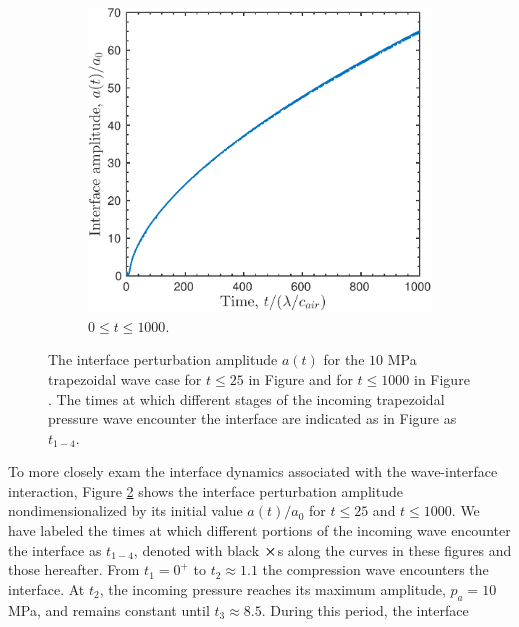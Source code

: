 \begin{figure}[h]
\begin{subfigure}[b]{0.45\textwidth}
    \includegraphics[width=\textwidth]{./figs/lung_figs/interface_single-case_linear}%
    \caption{\label{fig:trapz10_interface1000} $0\leq t \leq 1000$.}
  \end{subfigure}
  \caption[The interface perturbation amplitude history for 10 MPa
  trapezoidal wave]{The interface perturbation amplitude $a(t)$ for
    the $10$ MPa trapezoidal wave case for $t\leq25$ in Figure \protect{} and for
    $t\leq1000$ in Figure \protect{}. The times at which different stages of the
    incoming trapezoidal pressure wave encounter the interface are
    indicated as in Figure \protect{} as $t_{1-4}$.}
  \label{fig:trapz10_interface}
\end{figure}\par
% 
To more closely exam the interface dynamics associated with the
wave-interface interaction, Figure \ref{fig:trapz10_interface} shows
the interface perturbation amplitude nondimensionalized by its initial
value $a(t)/a_0$ for $t\leq25$ and $t\leq1000$. We have labeled the times at which
different portions of the incoming wave encounter the interface as
$t_{1-4}$, denoted with black $\boldsymbol{\times}$s along the curves in these
figures and those hereafter. From $t_1=0^+$ to $t_2\approx1.1$ the
compression wave encounters the interface. At $t_2$, the incoming
pressure reaches its maximum amplitude, $p_a=10$ MPa, and remains
constant until $t_3\approx8.5$. During this period, the interface

